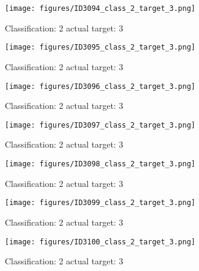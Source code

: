 \begin{figure}[h!]
\begin{center}
\texttt{[image: figures/ID3094\_class\_2\_target\_3.png]}
\end{center}
\caption{ Classification: 2 actual target: 3}
\label{fig:ID3094_class_2_target_3}
\end{figure}
\begin{figure}[h!]
\begin{center}
\texttt{[image: figures/ID3095\_class\_2\_target\_3.png]}
\end{center}
\caption{ Classification: 2 actual target: 3}
\label{fig:ID3095_class_2_target_3}
\end{figure}
\begin{figure}[h!]
\begin{center}
\texttt{[image: figures/ID3096\_class\_2\_target\_3.png]}
\end{center}
\caption{ Classification: 2 actual target: 3}
\label{fig:ID3096_class_2_target_3}
\end{figure}
\begin{figure}[h!]
\begin{center}
\texttt{[image: figures/ID3097\_class\_2\_target\_3.png]}
\end{center}
\caption{ Classification: 2 actual target: 3}
\label{fig:ID3097_class_2_target_3}
\end{figure}
\begin{figure}[h!]
\begin{center}
\texttt{[image: figures/ID3098\_class\_2\_target\_3.png]}
\end{center}
\caption{ Classification: 2 actual target: 3}
\label{fig:ID3098_class_2_target_3}
\end{figure}
\begin{figure}[h!]
\begin{center}
\texttt{[image: figures/ID3099\_class\_2\_target\_3.png]}
\end{center}
\caption{ Classification: 2 actual target: 3}
\label{fig:ID3099_class_2_target_3}
\end{figure}
\begin{figure}[h!]
\begin{center}
\texttt{[image: figures/ID3100\_class\_2\_target\_3.png]}
\end{center}
\caption{ Classification: 2 actual target: 3}
\label{fig:ID3100_class_2_target_3}
\end{figure}
